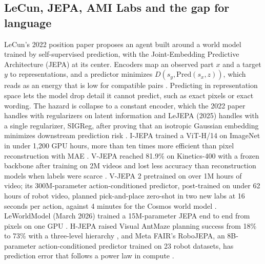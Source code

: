 \subsection{LeCun, JEPA, AMI Labs and the gap for language}
LeCun's 2022 position paper proposes an agent built around a world model trained by self-supervised prediction, with the Joint-Embedding Predictive Architecture (JEPA) at its center. Encoders map an observed part $x$ and a target $y$ to representations, and a predictor minimizes $D(s_y,\mathrm{Pred}(s_x,z))$, which reads as an energy that is low for compatible pairs \cite{post25}. Predicting in representation space lets the model drop detail it cannot predict, such as exact pixels or exact wording. The hazard is collapse to a constant encoder, which the 2022 paper handles with regularizers on latent information \cite{post25} and LeJEPA (2025) handles with a single regularizer, SIGReg, after proving that an isotropic Gaussian embedding minimizes downstream prediction risk \cite{post30}. I-JEPA trained a ViT-H/14 on ImageNet in under 1,200 GPU hours, more than ten times more efficient than pixel reconstruction with MAE \cite{post26}. V-JEPA reached 81.9\% on Kinetics-400 with a frozen backbone after training on 2M videos and lost less accuracy than reconstruction models when labels were scarce \cite{post27}. V-JEPA 2 pretrained on over 1M hours of video; its 300M-parameter action-conditioned predictor, post-trained on under 62 hours of robot video, planned pick-and-place zero-shot in two new labs at 16 seconds per action, against 4 minutes for the Cosmos world model \cite{post28}. LeWorldModel (March 2026) trained a 15M-parameter JEPA end to end from pixels on one GPU \cite{post31}. H-JEPA raised Visual AntMaze planning success from 18\% to 73\% with a three-level hierarchy \cite{post32}, and Meta FAIR's RoboJEPA, an 8B-parameter action-conditioned predictor trained on 23 robot datasets, has prediction error that follows a power law in compute \cite{post33}.

